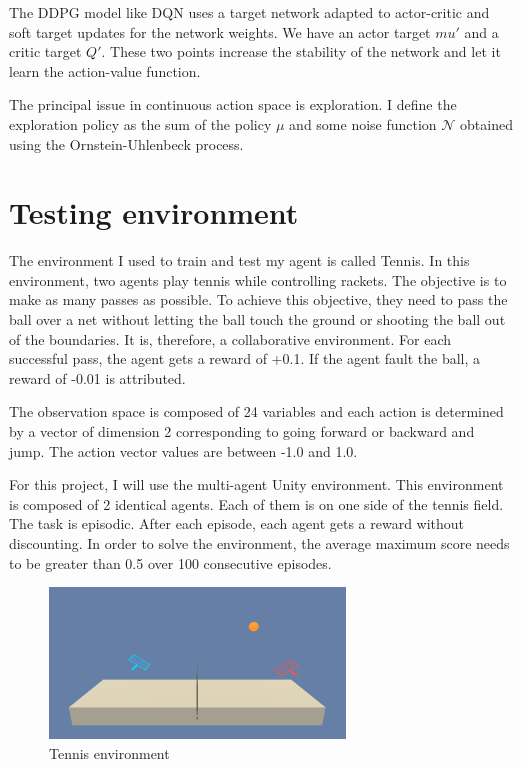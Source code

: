 \documentclass[12pt]{article}
\begin{document}
The DDPG model like DQN\cite{mnih2015humanlevel} uses a target network adapted to actor-critic and soft target updates for the network weights. We have an actor target $mu'$ and a critic target $Q'$. These two points increase the stability of the network and let it learn the action-value function. 

The principal issue in continuous action space is exploration. I define the exploration policy as the sum of the policy $\mu$ and some noise function $\mathcal{N}$ obtained using the Ornstein-Uhlenbeck process.


\section{Testing environment}
The environment I used to train and test my agent is called Tennis. In this environment, two agents play tennis while controlling rackets. The objective is to make as many passes as possible. To achieve this objective, they need to pass the ball over a net without letting the ball touch the ground or shooting the ball out of the boundaries. It is, therefore, a collaborative environment. For each successful pass, the agent gets a reward of +0.1. If the agent fault the ball, a reward of -0.01 is attributed.

The observation space is composed of 24 variables and each action is determined by a vector of dimension 2 corresponding to going forward or backward and jump. The action vector values are between -1.0 and 1.0.

For this project, I will use the multi-agent Unity environment. This environment is composed of 2 identical agents. Each of them is on one side of the tennis field. The task is episodic. After each episode, each agent gets a reward without discounting.  In order to solve the environment, the average maximum score needs to be greater than 0.5 over 100 consecutive episodes.

\begin{center}
\begin{figure}[H]
  \center
  \includegraphics[width=0.7\textwidth]{../PNG/env.png}
  \caption{Tennis environment}
  \label{fig:reacher_environment}
\end{figure}
\end{center}
\end{document}

